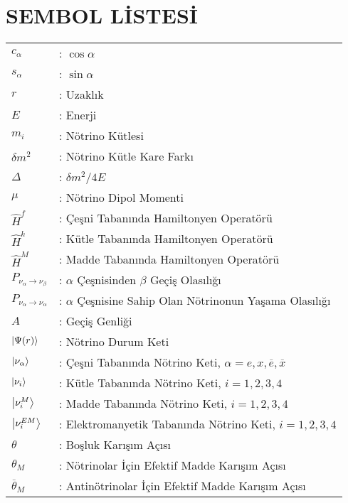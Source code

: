 \chapter{SEMBOL LİSTESİ}
\begin{longtable}{@{}l @{\hspace{10mm}} l }
$ c_{\alpha}            $ &: $\cos \alpha$ \\
$ s_{\alpha}            $ &: $\sin \alpha$ \\
$ r                     $ &: Uzaklık \\
$ E                     $ &: Enerji \\
$ m_{i}                 $ &: Nötrino Kütlesi \\
$ \delta m^{2}          $ &: Nötrino Kütle Kare Farkı \\
$ \Delta                $ &: $\delta m^{2}/4E$ \\
$ \mu                   $ &: Nötrino Dipol Momenti \\
$ \hat{H}^{f}           $ &: Çeşni Tabanında Hamiltonyen Operatörü\\
$ \hat{H}^{k}           $ &: Kütle Tabanında Hamiltonyen Operatörü\\
$ \hat{H}^{M}           $ &: Madde Tabanında Hamiltonyen Operatörü\\
$ P_{\nu_{\alpha}\rightarrow\nu_{\beta}}$ &: $ \alpha $ Çeşnisinden $ \beta $ Geçiş Olasılığı \\
$ P_{\nu_{\alpha}\rightarrow\nu_{\alpha}}$ &: $ \alpha $ Çeşnisine Sahip Olan Nötrinonun Yaşama Olasılığı\\
$ A                     $ &: Geçiş Genliği\\
$ \ket{\Psi(r)}         $ &: Nötrino Durum Keti\\
$ \ket{\nu_{\alpha}}    $ &: Çeşni Tabanında Nötrino Keti, $ \alpha = e,x,\overline{e},\overline{x} $ \\
$ \ket{\nu_{i}}         $ &: Kütle Tabanında Nötrino Keti, $ i = 1,2,3,4 $ \\
$ \ket{\nu_{i}^{M}}     $ &: Madde Tabanında Nötrino Keti, $ i = 1,2,3,4 $ \\
$ \ket{\nu_{i}^{EM}}    $ &: Elektromanyetik Tabanında Nötrino Keti, $ i = 1,2,3,4 $ \\
$ \theta                $ &: Boşluk Karışım Açısı \\
$ \theta_{M}            $ &: Nötrinolar İçin Efektif Madde Karışım Açısı \\
$ \overline{\theta}_{M} $ &: Antinötrinolar İçin Efektif Madde Karışım Açısı \\

\end{longtable}
